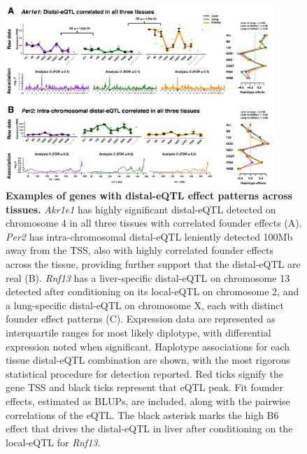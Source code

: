 \documentclass[9pt,twocolumn,twoside]{gsajnl}
\begin{document}

\begin{figure}[h!]
\renewcommand{\familydefault}{\sfdefault}\normalfont
\centering
\includegraphics[width=0.9\textwidth, trim={0in 0in 0in 0in}, clip]{figs/correlated_distal_eqtl.pdf}
\caption{\textbf{Examples of genes with distal-eQTL effect patterns across tissues.} \textit{Akr1e1} has highly significant distal-eQTL detected on chromosome 4 in all three tissues with correlated founder effects (A). \textit{Per2} has intra-chromosomal distal-eQTL leniently detected 100Mb away from the TSS, also with highly correlated founder effects across the tissue, providing further support that the distal-eQTL are real (B). \textit{Rnf13} has a liver-specific distal-eQTL on chromosome 13 detected after conditioning on its local-eQTL on chromosome 2, and a lung-specific distal-eQTL on chromosome X, each with distinct founder effect patterns (C). Expression data are represented as interquartile ranges for most likely diplotype, with differential expression noted when significant. Haplotype associations for each tissue distal-eQTL combination are shown, with the most rigorous statistical procedure for detection reported. Red ticks signify the gene TSS and black ticks represent that eQTL peak. Fit founder effects, estimated as BLUPs, are included, along with the pairwise correlations of the eQTL. The black asterisk marks the high B6 effect that drives the distal-eQTL in liver after conditioning on the local-eQTL for \textit{Rnf13}.
\label{fig:correlated_distal_eqtl}}
\end{figure}
\end{document}
